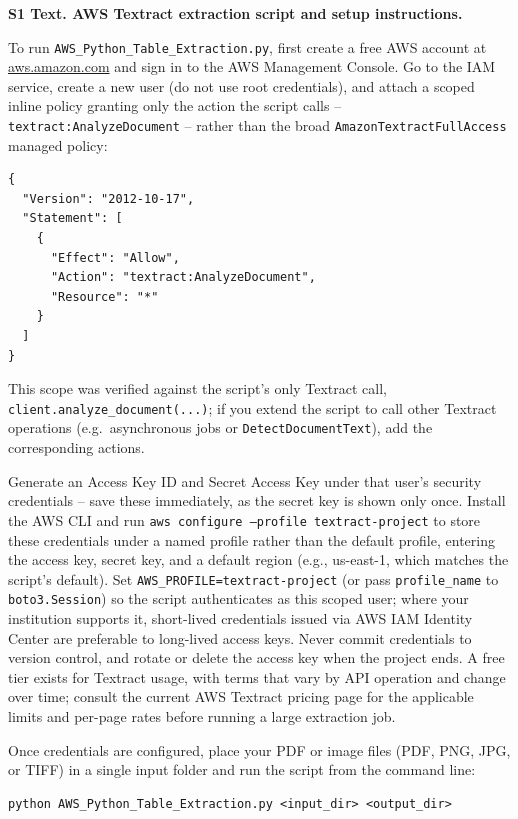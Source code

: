 \documentclass[12pt]{article}
\begin{document}
\textbf{S1 Text. AWS Textract extraction script and setup instructions.}

To run \texttt{AWS\_Python\_Table\_Extraction.py}, first create a free AWS account at \href{https://aws.amazon.com/}{aws.amazon.com} and sign in to the AWS Management Console. Go to the IAM service, create a new user (do not use root credentials), and attach a scoped inline policy granting only the action the script calls -- \texttt{textract:AnalyzeDocument} -- rather than the broad \texttt{AmazonTextractFullAccess} managed policy:

\begin{lstlisting}[basicstyle=\ttfamily\footnotesize]
{
  "Version": "2012-10-17",
  "Statement": [
    {
      "Effect": "Allow",
      "Action": "textract:AnalyzeDocument",
      "Resource": "*"
    }
  ]
}
\end{lstlisting}

\noindent This scope was verified against the script's only Textract call, \texttt{client.analyze\_document(...)}; if you extend the script to call other Textract operations (e.g.\ asynchronous jobs or \texttt{DetectDocumentText}), add the corresponding actions.

Generate an Access Key ID and Secret Access Key under that user's security credentials -- save these immediately, as the secret key is shown only once. Install the AWS CLI and run \texttt{aws configure --profile textract-project} to store these credentials under a named profile rather than the default profile, entering the access key, secret key, and a default region (e.g., us-east-1, which matches the script's default). Set \texttt{AWS\_PROFILE=textract-project} (or pass \texttt{profile\_name} to \texttt{boto3.Session}) so the script authenticates as this scoped user; where your institution supports it, short-lived credentials issued via AWS IAM Identity Center are preferable to long-lived access keys. Never commit credentials to version control, and rotate or delete the access key when the project ends. A free tier exists for Textract usage, with terms that vary by API operation and change over time; consult the current AWS Textract pricing page for the applicable limits and per-page rates before running a large extraction job.

Once credentials are configured, place your PDF or image files (PDF, PNG, JPG, or TIFF) in a single input folder and run the script from the command line:

\begin{lstlisting}[basicstyle=\ttfamily\footnotesize]
python AWS_Python_Table_Extraction.py <input_dir> <output_dir>
\end{lstlisting}
\end{document}
